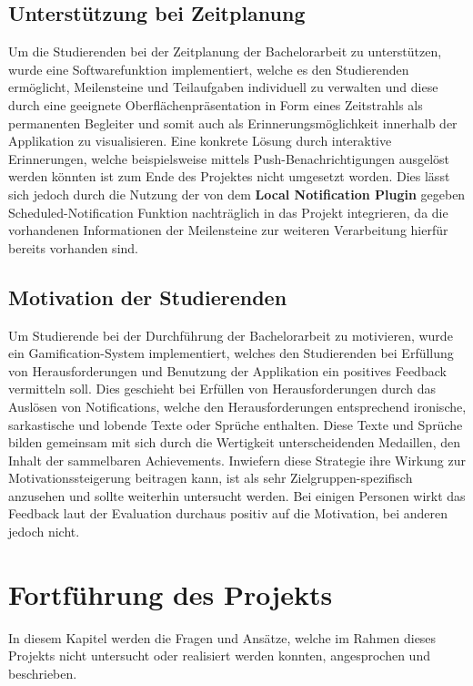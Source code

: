\documentclass[bibliography=totoc,listof=totoc,BCOR=5mm,DIV=12,oneside]{scrbook}
\begin{document}
{\subsection{Unterstützung bei Zeitplanung}
\par Um die Studierenden bei der Zeitplanung der Bachelorarbeit zu unterstützen, wurde eine Softwarefunktion implementiert, welche es den Studierenden ermöglicht, Meilensteine und Teilaufgaben individuell zu verwalten und diese durch eine geeignete Oberflächenpräsentation in Form eines Zeitstrahls als permanenten Begleiter und somit auch als Erinnerungsmöglichkeit innerhalb der Applikation zu visualisieren. Eine konkrete Lösung durch interaktive Erinnerungen, welche beispielsweise mittels Push-Benachrichtigungen ausgelöst werden könnten ist zum Ende des Projektes nicht umgesetzt worden. Dies lässt sich jedoch durch die Nutzung der von dem \textbf{Local Notification Plugin} gegeben Scheduled-Notification Funktion nachträglich in das Projekt integrieren, da die vorhandenen Informationen der Meilensteine zur weiteren Verarbeitung hierfür bereits vorhanden sind. 

\subsection{Motivation der Studierenden}
\par Um Studierende bei der Durchführung der Bachelorarbeit zu motivieren, wurde ein Gamification-System implementiert, welches den Studierenden bei Erfüllung von Herausforderungen und Benutzung der Applikation ein positives Feedback vermitteln soll. Dies geschieht bei Erfüllen von Herausforderungen durch das Auslösen von Notifications, welche den Herausforderungen entsprechend ironische, sarkastische und lobende Texte oder Sprüche enthalten. Diese Texte und Sprüche bilden gemeinsam mit sich durch die Wertigkeit unterscheidenden Medaillen, den Inhalt der sammelbaren Achievements. Inwiefern diese Strategie ihre Wirkung zur Motivationssteigerung beitragen kann, ist als sehr Zielgruppen-spezifisch anzusehen und sollte weiterhin untersucht werden. Bei einigen Personen wirkt das Feedback laut der Evaluation durchaus positiv auf die Motivation, bei anderen jedoch nicht.

\section{Fortführung des Projekts}
\par In diesem Kapitel werden die Fragen und Ansätze, welche im Rahmen dieses Projekts nicht untersucht oder realisiert werden konnten, angesprochen und beschrieben.

}
\end{document}

